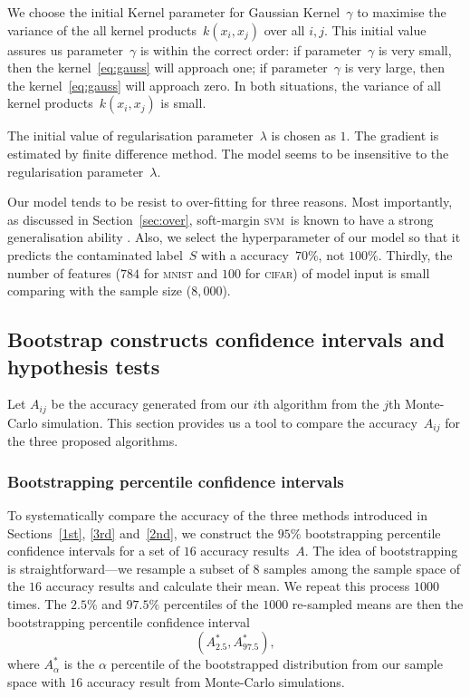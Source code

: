 \documentclass[12pt]{article} %
\newcommand{\svm}{\textsc{svm}}
\begin{document}
We choose the initial Kernel parameter for Gaussian Kernel~$\gamma$  to maximise the variance of the all kernel products~$k(x_i,x_j)$ over all $i,j$. 
This initial value assures us parameter~$\gamma$ is within the correct order: if parameter~$\gamma$ is very small, then the kernel~\eqref{eq:gauss} will approach one; if parameter~$\gamma$ is very large, then the kernel~\eqref{eq:gauss} will approach zero. In both situations, the variance of all kernel products~$k(x_i,x_j)$ is small.

The initial value of regularisation parameter~$\lambda$ is chosen as $1$.
The gradient is estimated by finite difference method.
The model seems to be insensitive to the regularisation parameter~$\lambda$.

Our model tends to be resist to over-fitting for three reasons. Most importantly, as discussed in Section~\ref{sec:over}, soft-margin \svm\ is known to have a strong generalisation ability \citep{NIPS2012_4500,Cortes1995,Seeger:2003:PGE:944919.944929}. Also, we select the hyperparameter of our model so that it predicts the contaminated label~$S$ with a accuracy~$70\%$, not $100\%$. Thirdly, the number of features ($784$ for \textsc{mnist} and $100$ for \textsc{cifar}) of model input is small comparing with the sample size ($8,000$).

\subsection{Bootstrap constructs confidence intervals and hypothesis tests}
Let $A_{ij}$ be the accuracy generated from our {$i$}th algorithm from the $j$th Monte-Carlo simulation. This section provides us a tool to compare the accuracy~$A_{ij}$ for the three proposed algorithms.
\subsubsection{Bootstrapping percentile confidence intervals}\label{ci}
To systematically compare the accuracy of the three methods introduced in Sections~\ref{1st}, \ref{3rd} and~\ref{2nd}, we construct the $95\%$ bootstrapping percentile confidence intervals for a set of $16$ accuracy results~$A$. The idea of bootstrapping  is straightforward---we resample a subset of $8$ samples among the sample space of the $16$ accuracy results and calculate their mean. We repeat this process $1000$ times. The $2.5\%$ and $97.5\%$ percentiles of the $1000$ re-sampled means are then the bootstrapping percentile confidence interval
\begin{equation}
({A}^*_{2.5}, {A}^*_{97.5}), \label{eq:boot}
\end{equation}
where $A^*_{\alpha}$ is the $\alpha$ percentile of the bootstrapped distribution from our sample space with $16$ accuracy result from Monte-Carlo simulations.
\end{document}
